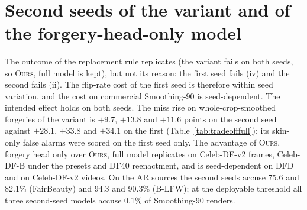\documentclass[10pt]{article}
\newcommand{\oursB}{\textsc{Ours}, forgery head only}
\newcommand{\oursF}{\textsc{Ours}, full model}
\begin{document}
\begin{table}[H]
\centering
\caption{ICT and ICT-Ref with released weights on the same probes (ICT\_PROBE.md, Addendum 52). Top: AUC, change against
untreated in parentheses, with its 95\% identity-bootstrap interval. Bottom: false alarm / miss (\%) at the untreated 5\%-FPR
threshold.}
\label{tab:ict}
\scriptsize
\begin{adjustbox}{max width=\linewidth}\end{adjustbox}\\[4pt]
\begin{adjustbox}{max width=\linewidth}\end{adjustbox}
\end{table}

\section{Second seeds of the variant and of the forgery-head-only model}
\label{sec:seeds}
\begin{table}[H]
\centering
\caption{The declared replacement criteria of the variant and the declared comparisons of \oursB{} minus \oursF{} on two seeds, each within
its seed (paired video-cluster intervals, 1,000 draws). ``Replicated'': same verdict, or same interval category, on both seeds.}
\label{tab:seeds}
\scriptsize
\begin{adjustbox}{max width=\linewidth}\end{adjustbox}
\end{table}
The outcome of the replacement rule replicates (the variant fails on both seeds, so \oursF{} is kept), but not its reason: the first
seed fails (iv) and the second fails (ii). The flip-rate cost of the first seed is therefore within seed variation, and the cost on
commercial Smoothing-90 is seed-dependent. The intended effect holds on both seeds. The miss rise on whole-crop-smoothed forgeries
of the variant is $+9.7$, $+13.8$ and $+11.6$ points on the second seed against $+28.1$, $+33.8$ and $+34.1$ on the first
(Table~\ref{tab:tradeofffull}); its skin-only false alarms were scored on the first seed only. The advantage of \oursB{} over
\oursF{} replicates on Celeb-DF-v2 frames, Celeb-DF-B under the presets and DF40 reenactment, and is seed-dependent on DFD and on
Celeb-DF-v2 videos. On the AR sources the second seeds accuse 75.6 and 82.1\% (FairBeauty) and 94.3 and 90.3\% (B-LFW); at the
deployable threshold all three second-seed models accuse 0.1\% of Smoothing-90 renders.
\end{document}

